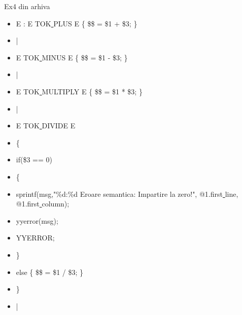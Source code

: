 \documentclass[pdf]{beamer}
\begin{document}
\begin{frame}{Ex4 din arhiva}
\begin{itemize}
\item
E : E TOK\underline{ }PLUS E \{ \$\$ = \$1 + \$3; \}
\item \hspace{4mm}
    |
\item \hspace{4mm}
    E TOK\underline{ }MINUS E \{ \$\$ = \$1 - \$3; \}
\item \hspace{4mm}
    |
\item \hspace{4mm}
    E TOK\underline{ }MULTIPLY E \{ \$\$ = \$1 * \$3; \}
\item \hspace{4mm}
    |
\item \hspace{4mm}
    E TOK\underline{ }DIVIDE E 
\item \hspace{6mm}
	\{ 
\item \hspace{8mm}
	  if(\$3 == 0) 
\item \hspace{8mm}
	  \{ 
\item \hspace{10mm}
	      sprintf(msg,"\%d:\%d Eroare semantica: Impartire la zero!", @1.first\underline{ }line, @1.first\underline{ }column);
\item \hspace{10mm}
	      yyerror(msg);
\item \hspace{10mm}
	      YYERROR;
\item \hspace{8mm}
	  \} 
\item \hspace{8mm}
	  else \{ \$\$ = \$1 / \$3; \} 
\item \hspace{6mm}
	\}
\item \hspace{4mm}
    | 
\end{itemize}
\end{frame}
\end{document}
